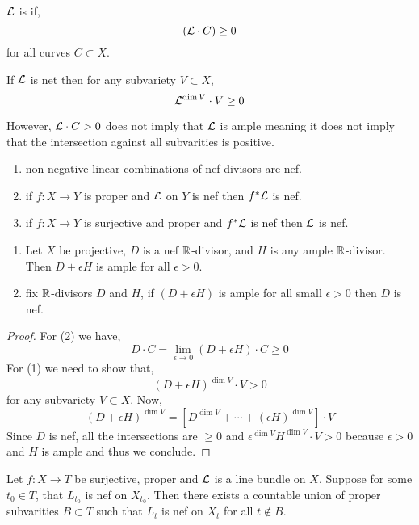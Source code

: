 \documentclass[12pt]{article}
\begin{document}
\begin{defn}
$\mathcal{L}$ is  if,
\[ (\mathcal{L} \cdot C) \ge 0 \]
for all curves $C \subset X$. 
\end{defn}

\begin{theorem}[Kleiman]
If $\mathcal{L}$ is net then for any subvariety $V \subset X$,
\[ \mathcal{L}^{\dim{V}} \cdot V \ge 0 \]
\end{theorem}

\begin{rmk}
However, $\mathcal{L} \cdot C > 0$ does not imply that $\mathcal{L}$ is ample meaning it does not imply that the intersection against all subvarities is positive. 
\end{rmk}

\begin{prop}
\begin{enumerate}
\item non-negative linear combinations of nef divisors are nef.
\item if $f : X \to Y$ is proper and $\mathcal{L}$ on $Y$ is nef then $f^* \mathcal{L}$ is nef.
\item if $f : X \to Y$ is surjective and proper and $f^* \mathcal{L}$ is nef then $\mathcal{L}$ is nef. 
\end{enumerate}
\end{prop}

\begin{cor}
\begin{enumerate}
\item Let $X$ be projective, $D$ is a nef $\mathbb{R}$-divisor, and $H$ is any ample $\mathbb{R}$-divisor. Then $D + \epsilon H$ is ample for all $\epsilon > 0$. 
\item fix $\mathbb{R}$-divisors $D$ and $H$, if $(D + \epsilon H)$ is ample for all small $\epsilon > 0$ then $D$ is nef. 
\end{enumerate}
\end{cor}

\begin{proof}
For (2) we have,
\[ D \cdot C = \lim_{\epsilon \to 0} (D + \epsilon H) \cdot C \ge 0 \]
For (1) we need to show that,
\[ (D + \epsilon H)^{\dim{V}} \cdot V > 0 \]
for any subvariety $V \subset X$. Now,
\[ (D + \epsilon H)^{\dim{V}} = [D^{\dim{V}} + \cdots + (\epsilon H)^{\dim{V}} ] \cdot V \]
Since $D$ is nef, all the intersections are $\ge 0$ and $\epsilon^{\dim{V}} H^{\dim{V}} \cdot V > 0$ because $\epsilon > 0$ and $H$ is ample and thus we conclude.
\end{proof}

\begin{prop}
Let $f : X \to T$ be surjective, proper and $\mathcal{L}$ is a line bundle on $X$. Suppose for some $t_0 \in T$, that $L_{t_0}$ is nef on $X_{t_0}$. Then there exists a countable union of proper subvarities $B \subset T$ such that $L_t$ is nef on $X_t$ for all $t \notin B$. 
\end{prop}
\end{document}
